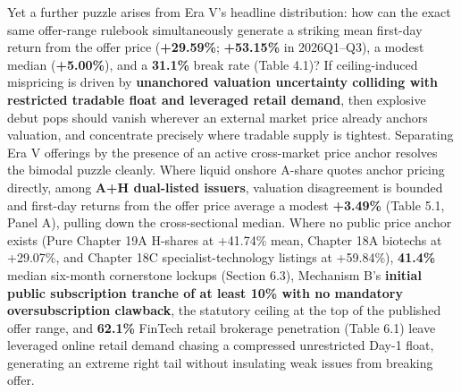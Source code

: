 \documentclass[11pt,letterpaper]{article}
\begin{document}
Yet a further puzzle arises from Era V's headline distribution: how can the exact same offer-range rulebook simultaneously generate a striking mean first-day return from the offer price (\textbf{+29.59\%}; \textbf{+53.15\%} in 2026Q1–Q3), a modest median (\textbf{+5.00\%}), and a \textbf{31.1\%} break rate (Table 4.1)? If ceiling-induced mispricing is driven by \textbf{unanchored valuation uncertainty colliding with restricted tradable float and leveraged retail demand}, then explosive debut pops should vanish wherever an external market price already anchors valuation, and concentrate precisely where tradable supply is tightest. Separating Era V offerings by the presence of an active cross-market price anchor resolves the bimodal puzzle cleanly. Where liquid onshore A-share quotes anchor pricing directly, among \textbf{A+H dual-listed issuers}, valuation disagreement is bounded and first-day returns from the offer price average a modest \textbf{+3.49\%} (Table 5.1, Panel A), pulling down the cross-sectional median. Where no public price anchor exists (Pure Chapter 19A H-shares at +41.74\% mean, Chapter 18A biotechs at +29.07\%, and Chapter 18C specialist-technology listings at +59.84\%), \textbf{41.4\%} median six-month cornerstone lockups (Section 6.3), Mechanism B's \textbf{initial public subscription tranche of at least 10\% with no mandatory oversubscription clawback}, the statutory ceiling at the top of the published offer range, and \textbf{62.1\%} FinTech retail brokerage penetration (Table 6.1) leave leveraged online retail demand chasing a compressed unrestricted Day-1 float, generating an extreme right tail without insulating weak issues from breaking offer.
\end{document}
